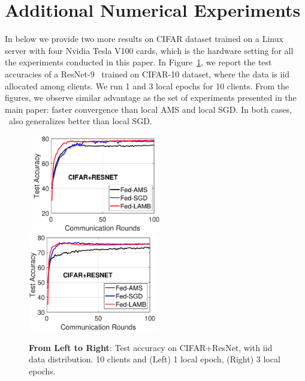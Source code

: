 \documentclass[11pt]{article}
\begin{document}
\section{Additional Numerical Experiments}\label{app:numericals}

In below we provide two more results on CIFAR dataset trained on a Linux server with four Nvidia Tesla V100 cards, which is the hardware setting for all the experiments conducted in this paper. In Figure~\ref{fig:cifar-cnn-iid-bis}, we report the test accuracies of a ResNet-9~\cite{Proc:He-resnet16} trained on CIFAR-10 dataset, where the data is iid allocated among clients. 
We run 1 and 3 local epochs for 10 clients. From the figures, we observe similar advantage as the set of experiments presented in the main paper: faster convergence than local AMS and local SGD. In both cases, \algo\ also generalizes better than local SGD.


\begin{figure}[H]
    \begin{center}
        \mbox{
        \includegraphics[width=0.5\textwidth]{figure/cifar_testerror_resnet_ep1_client10_iid1_SGD.eps}
                \includegraphics[width=0.5\textwidth]{figure/cifar_testerror_resnet_ep3_client10_iid1_SGD.eps}
        }
    \end{center}
	\caption{\textbf{From Left to Right}: Test accuracy on CIFAR+ResNet, with iid data distribution. 10 clients and (Left) 1 local epoch, (Right) 3 local epochs.}
	\label{fig:cifar-cnn-iid-bis}
\end{figure}
\end{document}
